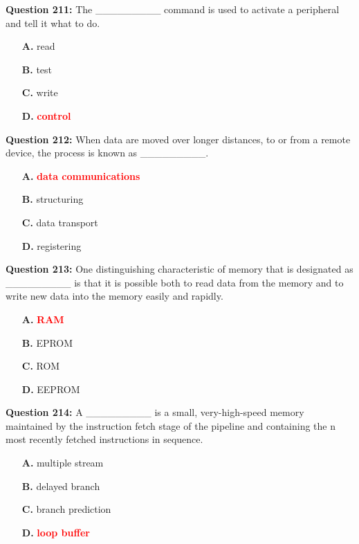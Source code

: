 \documentclass[12pt,a4paper]{article}
\begin{document}
\vspace{0.5cm}

\textbf{Question 211:} The _________ command is used to activate a peripheral and tell it what to do.

\begin{itemize}
    \item[\textbf{A.}] read
    \item[\textbf{B.}] test
    \item[\textbf{C.}] write
    \item[\textbf{D.}] \textcolor{red}{\textbf{control}}
\end{itemize}

\vspace{0.5cm}

\textbf{Question 212:} When data are moved over longer distances, to or from a remote device, the process is known as _________.

\begin{itemize}
    \item[\textbf{A.}] \textcolor{red}{\textbf{data communications}}
    \item[\textbf{B.}] structuring
    \item[\textbf{C.}] data transport
    \item[\textbf{D.}] registering
\end{itemize}

\vspace{0.5cm}

\textbf{Question 213:} One distinguishing characteristic of memory that is designated as _________ is that it is possible both to read data from the memory and to write new data into the memory easily and rapidly.

\begin{itemize}
    \item[\textbf{A.}] \textcolor{red}{\textbf{RAM}}
    \item[\textbf{B.}] EPROM
    \item[\textbf{C.}] ROM
    \item[\textbf{D.}] EEPROM
\end{itemize}

\vspace{0.5cm}

\textbf{Question 214:} A _________ is a small, very-high-speed memory maintained by the instruction fetch stage of the pipeline and containing the n most recently fetched instructions in sequence.

\begin{itemize}
    \item[\textbf{A.}] multiple stream
    \item[\textbf{B.}] delayed branch
    \item[\textbf{C.}] branch prediction
    \item[\textbf{D.}] \textcolor{red}{\textbf{loop buffer}}
\end{itemize}
\end{document}
